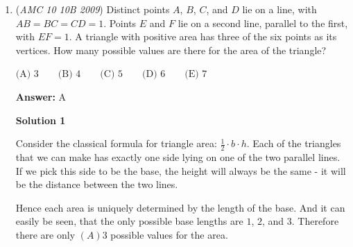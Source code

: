 \begin{enumerate}
 Say we have a 3 first. By symmetry, this is the same as the 2 cases, so we have $2$ ways.

 Say we have a 5 first. We then have a 5 in the middle. We can either have a 2 second or a 3 second. So we have $2$ ways.

 This means that our answer is $2+2+2=\boxed{\textbf{(A)}6}$




\textbf{Solution 3 (bijection)}

\textbf{Lemma:} 5 must be the middle digit.

 \textbf{Proof of the Lemma:}

 If it wasn't, then one 2 or 3 must be the middle digit. This then forces less 2 or 3 to reach \textit{palindromic equilibrium}, which is the number of viable digits allowed in which a palindrome can be formed. Indeed, 5 must be the middle.

 \textbf{2009 AMC 10B P11}

 Place 5 in the middle. Then consider the six digit number formed by removing 5. This integer must be a palindrome, and we have two each of 2,3,5 to make this palindrome. There are three choices for the first digit, two for the second, and one for the third, fourth, fifth, and sixth. Thus, the count is $3 \cdot 2 = \boxed{6}$.

 


	\item (\textit{AMC 10 10B 2009}) Distinct points $A$, $B$, $C$, and $D$ lie on a line, with $AB=BC=CD=1$. Points $E$ and $F$ lie on a second line, parallel to the first, with $EF=1$. A triangle with positive area has three of the six points as its vertices. How many possible values are there for the area of the triangle?


 $\text{(A) } 3 \qquad \text{(B) } 4 \qquad \text{(C) } 5 \qquad \text{(D) } 6 \qquad \text{(E) } 7$

 \textbf{Answer: }A



\textbf{Solution 1}

Consider the classical formula for triangle area: $\frac 12 \cdot b \cdot h$. Each of the triangles that we can make has exactly one side lying on one of the two parallel lines. If we pick this side to be the base, the height will always be the same - it will be the distance between the two lines.

 Hence each area is uniquely determined by the length of the base. And it can easily be seen, that the only possible base lengths are $1$, $2$, and $3$. Therefore there are only $\boxed{(A)3}$ possible values for the area.


\end{enumerate}
